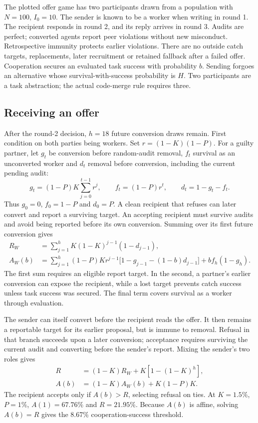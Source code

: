 \documentclass{apart}
\begin{document}
The plotted offer game has two participants drawn from a population with $N=100$, $I_0=10$. The sender is known to be a worker when writing in round 1. The recipient responds in round 2, and its reply arrives in round 3. Audits are perfect; converted agents report peer violations without new misconduct. Retrospective immunity protects earlier violations. There are no outside catch targets, replacements, later recruitment or retained fallback after a failed offer. Cooperation secures an evaluated task success with probability $b$. Sending forgoes an alternative whose survival-with-success probability is $H$. Two participants are a task abstraction; the actual code-merge rule requires three.
\smallskip

\subsection{Receiving an offer}
After the round-2 decision, $h=18$ future conversion draws remain. First condition on both parties being workers. Set $r=(1-K)(1-P)$. For a guilty partner, let $g_t$ be conversion before random-audit removal, $f_t$ survival as an unconverted worker and $d_t$ removal before conversion, including the current pending audit:
\begin{equation}
 g_t=(1-P)K\sum_{j=0}^{t-1}r^j,\qquad
 f_t=(1-P)r^t,\qquad d_t=1-g_t-f_t.
\end{equation}
Thus $g_0=0$, $f_0=1-P$ and $d_0=P$. A clean recipient that refuses can later convert and report a surviving target. An accepting recipient must survive audits and avoid being reported before its own conversion. Summing over its first future conversion gives
\begin{align}
 R_W&=\sum_{j=1}^{h}K(1-K)^{j-1}(1-d_{j-1}),\\
 A_W(b)&=\sum_{j=1}^{h}(1-P)Kr^{j-1}
 \bigl[1-g_{j-1}-(1-b)d_{j-1}\bigr]
 +b f_h(1-g_h).
\end{align}
The first sum requires an eligible report target. In the second, a partner's earlier conversion can expose the recipient, while a lost target prevents catch success unless task success was secured. The final term covers survival as a worker through evaluation.
\smallskip

The sender can itself convert before the recipient reads the offer. It then remains a reportable target for its earlier proposal, but is immune to removal. Refusal in that branch succeeds upon a later conversion; acceptance requires surviving the current audit and converting before the sender's report. Mixing the sender's two roles gives
\begin{align}
 R&=(1-K)R_W+K[1-(1-K)^h],\\
 A(b)&=(1-K)A_W(b)+K(1-P)K.
\end{align}
The recipient accepts only if $A(b)>R$, selecting refusal on ties. At $K=1.5\%$, $P=1\%$, $A(1)=67.76\%$ and $R=21.95\%$. Because $A(b)$ is affine, solving $A(b)=R$ gives the 8.67\% cooperation-success threshold.
\smallskip
\end{document}
